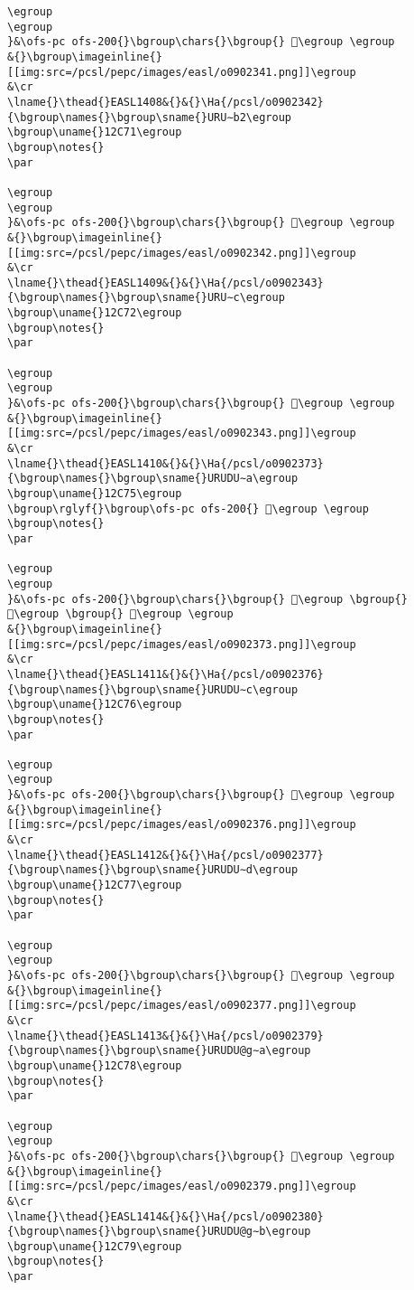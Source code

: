 \begin{verbatim}
\egroup
\egroup
}&\ofs-pc ofs-200{}\bgroup\chars{}\bgroup{} 𒱰\egroup \egroup
&{}\bgroup\imageinline{}[[img:src=/pcsl/pepc/images/easl/o0902341.png]]\egroup
&\cr
\lname{}\thead{}EASL1408&{}&{}\Ha{/pcsl/o0902342}{\bgroup\names{}\bgroup\sname{}URU∼b2\egroup
\bgroup\uname{}12C71\egroup
\bgroup\notes{}
\par 

\egroup
\egroup
}&\ofs-pc ofs-200{}\bgroup\chars{}\bgroup{} 𒱱\egroup \egroup
&{}\bgroup\imageinline{}[[img:src=/pcsl/pepc/images/easl/o0902342.png]]\egroup
&\cr
\lname{}\thead{}EASL1409&{}&{}\Ha{/pcsl/o0902343}{\bgroup\names{}\bgroup\sname{}URU∼c\egroup
\bgroup\uname{}12C72\egroup
\bgroup\notes{}
\par 

\egroup
\egroup
}&\ofs-pc ofs-200{}\bgroup\chars{}\bgroup{} 𒱲\egroup \egroup
&{}\bgroup\imageinline{}[[img:src=/pcsl/pepc/images/easl/o0902343.png]]\egroup
&\cr
\lname{}\thead{}EASL1410&{}&{}\Ha{/pcsl/o0902373}{\bgroup\names{}\bgroup\sname{}URUDU∼a\egroup
\bgroup\uname{}12C75\egroup
\bgroup\rglyf{}\bgroup\ofs-pc ofs-200{} 𒱵\egroup \egroup
\bgroup\notes{}
\par 

\egroup
\egroup
}&\ofs-pc ofs-200{}\bgroup\chars{}\bgroup{} 𒱳\egroup \bgroup{} 𒱴\egroup \bgroup{} 𒱵\egroup \egroup
&{}\bgroup\imageinline{}[[img:src=/pcsl/pepc/images/easl/o0902373.png]]\egroup
&\cr
\lname{}\thead{}EASL1411&{}&{}\Ha{/pcsl/o0902376}{\bgroup\names{}\bgroup\sname{}URUDU∼c\egroup
\bgroup\uname{}12C76\egroup
\bgroup\notes{}
\par 

\egroup
\egroup
}&\ofs-pc ofs-200{}\bgroup\chars{}\bgroup{} 𒱶\egroup \egroup
&{}\bgroup\imageinline{}[[img:src=/pcsl/pepc/images/easl/o0902376.png]]\egroup
&\cr
\lname{}\thead{}EASL1412&{}&{}\Ha{/pcsl/o0902377}{\bgroup\names{}\bgroup\sname{}URUDU∼d\egroup
\bgroup\uname{}12C77\egroup
\bgroup\notes{}
\par 

\egroup
\egroup
}&\ofs-pc ofs-200{}\bgroup\chars{}\bgroup{} 𒱷\egroup \egroup
&{}\bgroup\imageinline{}[[img:src=/pcsl/pepc/images/easl/o0902377.png]]\egroup
&\cr
\lname{}\thead{}EASL1413&{}&{}\Ha{/pcsl/o0902379}{\bgroup\names{}\bgroup\sname{}URUDU@g∼a\egroup
\bgroup\uname{}12C78\egroup
\bgroup\notes{}
\par 

\egroup
\egroup
}&\ofs-pc ofs-200{}\bgroup\chars{}\bgroup{} 𒱸\egroup \egroup
&{}\bgroup\imageinline{}[[img:src=/pcsl/pepc/images/easl/o0902379.png]]\egroup
&\cr
\lname{}\thead{}EASL1414&{}&{}\Ha{/pcsl/o0902380}{\bgroup\names{}\bgroup\sname{}URUDU@g∼b\egroup
\bgroup\uname{}12C79\egroup
\bgroup\notes{}
\par 


\end{verbatim}
